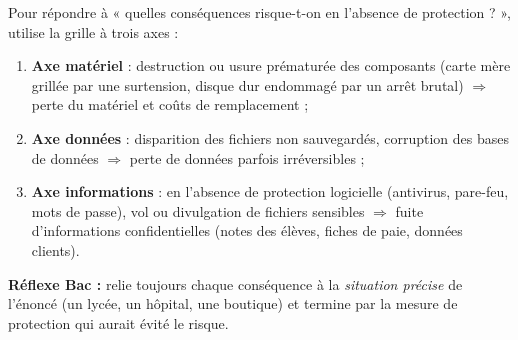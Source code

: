 \documentclass[11pt]{article}
\newcommand{\cle}[1]{{\popxbold\color{popdark}#1}}
\begin{document}
\begin{methode}
Pour répondre à « quelles conséquences risque-t-on en l'absence de protection ? », utilise la grille à trois axes :
\begin{enumerate}
\item \textbf{Axe matériel} : destruction ou usure prématurée des composants (carte mère grillée par une surtension, disque dur endommagé par un arrêt brutal) $\Rightarrow$ \cle{perte du matériel} et coûts de remplacement ;
\item \textbf{Axe données} : disparition des fichiers non sauvegardés, corruption des bases de données $\Rightarrow$ \cle{perte de données} parfois irréversibles ;
\item \textbf{Axe informations} : en l'absence de protection logicielle (antivirus, pare-feu, mots de passe), vol ou divulgation de fichiers sensibles $\Rightarrow$ \cle{fuite d'informations confidentielles} (notes des élèves, fiches de paie, données clients).
\end{enumerate}
\textbf{Réflexe Bac :} relie toujours chaque conséquence à la \emph{situation précise} de l'énoncé (un lycée, un hôpital, une boutique) et termine par la mesure de protection qui aurait évité le risque.
\end{methode}
\end{document}

